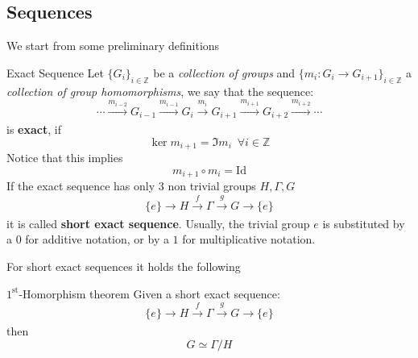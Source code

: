 \subsection{Sequences}
We start from some preliminary definitions
\begin{defn}{Exact Sequence}{}
    Let \textit{$\{G_i\}_{i \in \mathbb{Z}}$} be a \textit{collection of groups} and \textit{$\{m_i: G_i \to G_{i+1}\}_{i \in \mathbb{Z}}$} a \textit{collection of group homomorphisms}, we say that the sequence:
\begin{equation}\label{exact}
      \cdots \xrightarrow[]{m_{i-2}} G_{i-1} \xrightarrow[]{m_{i-1}} G_i \xrightarrow[]{m_i}   G_{i+1} \xrightarrow[]{m_{i+1}} G_{i+2} \xrightarrow[]{m_{i+2}} \cdots
\end{equation}
is \textbf{exact}, if
\begin{equation*}
        \ker m_{i+1}= \Im m_i \,\,\,\forall i \in \mathbb{Z}
\end{equation*}
Notice that this implies
\begin{equation*}
          m_{i+1} \circ m_i  = \text{Id}
\end{equation*}
If the exact sequence has only $3$ non trivial groups $H, \Gamma, G$
 \begin{equation*}
      \{e\} \xrightarrow[]{} H  \xrightarrow[]{f} \Gamma \xrightarrow[]{g}   G \xrightarrow[]{} \{e\}
    \end{equation*}
it is called \textbf{short exact sequence}. Usually, the trivial group ${e}$ is substituted by a $0$ for additive notation, or by a ${1}$ for multiplicative notation.
\end{defn}
For short exact sequences it holds the following
\begin{thm}{$1^{\text{st}}$-Homorphism theorem}{}
Given a short exact sequence: 
\begin{equation*}
      \{e\} \xrightarrow[]{} H  \xrightarrow[]{f} \Gamma \xrightarrow[]{g}   G \xrightarrow[]{} \{e\}
    \end{equation*}
then
\begin{equation*}
    G \simeq  \Gamma / H
\end{equation*}
\end{thm}


